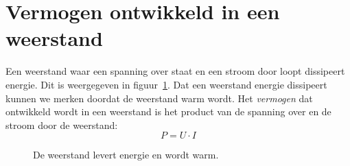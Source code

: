 \section{Vermogen ontwikkeld in een weerstand}
Een weerstand waar een spanning over staat en een stroom door loopt dissipeert energie. Dit is weergegeven in
figuur~\ref{fig:gelvermogensdissipatie}. Dat een weerstand energie dissipeert kunnen we merken doordat de
weerstand warm wordt.
Het \textsl{vermogen} dat ontwikkeld wordt in een weerstand is het product van de spanning over
en de stroom door de weerstand:
%
\begin{equation}
P = U\cdot I 
\end{equation}

\begin{figure}[!ht]
\centering
{}
\caption{De weerstand levert energie en wordt warm.}
\label{fig:gelvermogensdissipatie}
\end{figure}

